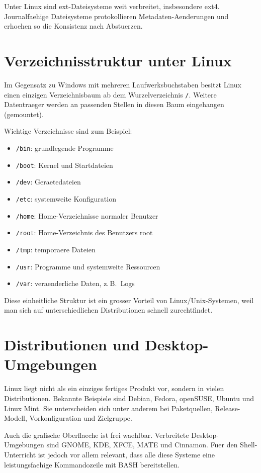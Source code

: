 \documentclass[11pt, oneside, numbers=noenddot]{scrbook}
\begin{document}
Unter Linux sind ext-Dateisysteme weit verbreitet, insbesondere ext4. Journalfaehige Dateisysteme protokollieren Metadaten-Aenderungen und erhoehen so die Konsistenz nach Abstuerzen.

\section{Verzeichnisstruktur unter Linux}
Im Gegensatz zu Windows mit mehreren Laufwerksbuchstaben besitzt Linux einen einzigen Verzeichnisbaum ab dem Wurzelverzeichnis \texttt{/}. Weitere Datentraeger werden an passenden Stellen in diesen Baum eingehangen (gemountet).

Wichtige Verzeichnisse sind zum Beispiel:
\begin{itemize}
\item \texttt{/bin}: grundlegende Programme
\item \texttt{/boot}: Kernel und Startdateien
\item \texttt{/dev}: Geraetedateien
\item \texttt{/etc}: systemweite Konfiguration
\item \texttt{/home}: Home-Verzeichnisse normaler Benutzer
\item \texttt{/root}: Home-Verzeichnis des Benutzers root
\item \texttt{/tmp}: temporaere Dateien
\item \texttt{/usr}: Programme und systemweite Ressourcen
\item \texttt{/var}: veraenderliche Daten, z.\,B.\ Logs
\end{itemize}

Diese einheitliche Struktur ist ein grosser Vorteil von Linux/Unix-Systemen, weil man sich auf unterschiedlichen Distributionen schnell zurechtfindet.

\section{Distributionen und Desktop-Umgebungen}
Linux liegt nicht als ein einziges fertiges Produkt vor, sondern in vielen Distributionen. Bekannte Beispiele sind Debian, Fedora, openSUSE, Ubuntu und Linux Mint. Sie unterscheiden sich unter anderem bei Paketquellen, Release-Modell, Vorkonfiguration und Zielgruppe.

Auch die grafische Oberflaeche ist frei waehlbar. Verbreitete Desktop-Umgebungen sind GNOME, KDE, XFCE, MATE und Cinnamon. Fuer den Shell-Unterricht ist jedoch vor allem relevant, dass alle diese Systeme eine leistungsfaehige Kommandozeile mit BASH bereitstellen.
\end{document}
